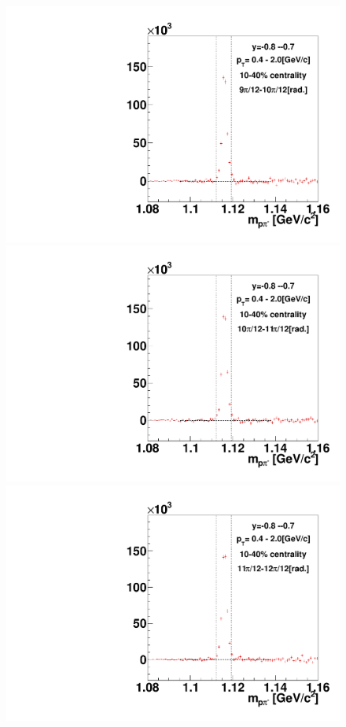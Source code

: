 \begin{figure}[h]
\includegraphics[width=0.14\linewidth]{chapterX/fig/ld_v1_sig/kf_ptslice0_cent1_ld_flow_phi10_rap12.pdf}
\includegraphics[width=0.14\linewidth]{chapterX/fig/ld_v1_sig/kf_ptslice0_cent1_ld_flow_phi11_rap12.pdf}
\includegraphics[width=0.14\linewidth]{chapterX/fig/ld_v1_sig/kf_ptslice0_cent1_ld_flow_phi12_rap12.pdf}


\end{figure}
